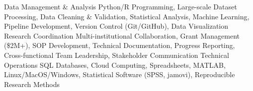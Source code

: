 \newpage
{}

\begin{cvskills}

\cvskill
    {Data Management \& Analysis} %
    {Python/R Programming, Large-scale Dataset Processing, Data Cleaning \& Validation, Statistical Analysis, Machine Learning, Pipeline Development, Version Control (Git/GitHub), Data Visualization} %
\cvskill
    {Research Coordination} %
    {Multi-institutional Collaboration, Grant Management (\$2M+), SOP Development, Technical Documentation, Progress Reporting, Cross-functional Team Leadership, Stakeholder Communication} %
\cvskill
    {Technical Operations} %
    {SQL Databases, Cloud Computing, Spreadsheets, MATLAB, Linux/MacOS/Windows, Statistical Software (SPSS, jamovi), Reproducible Research Methods} %

\end{cvskills}
